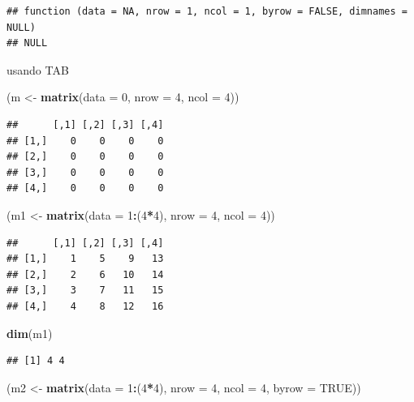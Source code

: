 \documentclass[]{book}
\newenvironment{Shaded}{\begin{snugshade}}{\end{snugshade}}
\newcommand{\KeywordTok}[1]{\textcolor[rgb]{0.13,0.29,0.53}{\textbf{#1}}}
\newcommand{\DataTypeTok}[1]{\textcolor[rgb]{0.13,0.29,0.53}{#1}}
\newcommand{\DecValTok}[1]{\textcolor[rgb]{0.00,0.00,0.81}{#1}}
\newcommand{\StringTok}[1]{\textcolor[rgb]{0.31,0.60,0.02}{#1}}
\newcommand{\OtherTok}[1]{\textcolor[rgb]{0.56,0.35,0.01}{#1}}
\newcommand{\OperatorTok}[1]{\textcolor[rgb]{0.81,0.36,0.00}{\textbf{#1}}}
\newcommand{\NormalTok}[1]{#1}
\begin{document}
\begin{verbatim}
## function (data = NA, nrow = 1, ncol = 1, byrow = FALSE, dimnames = NULL) 
## NULL
\end{verbatim}

usando TAB

\begin{Shaded}
\begin{Highlighting}[]
\NormalTok{(m <-}\StringTok{ }\KeywordTok{matrix}\NormalTok{(}\DataTypeTok{data =} \DecValTok{0}\NormalTok{, }\DataTypeTok{nrow =} \DecValTok{4}\NormalTok{, }\DataTypeTok{ncol =} \DecValTok{4}\NormalTok{))}
\end{Highlighting}
\end{Shaded}

\begin{verbatim}
##      [,1] [,2] [,3] [,4]
## [1,]    0    0    0    0
## [2,]    0    0    0    0
## [3,]    0    0    0    0
## [4,]    0    0    0    0
\end{verbatim}

\begin{Shaded}
\begin{Highlighting}[]
\NormalTok{(m1 <-}\StringTok{ }\KeywordTok{matrix}\NormalTok{(}\DataTypeTok{data =} \DecValTok{1}\OperatorTok{:}\NormalTok{(}\DecValTok{4}\OperatorTok{*}\DecValTok{4}\NormalTok{), }\DataTypeTok{nrow =} \DecValTok{4}\NormalTok{, }\DataTypeTok{ncol =} \DecValTok{4}\NormalTok{))}
\end{Highlighting}
\end{Shaded}

\begin{verbatim}
##      [,1] [,2] [,3] [,4]
## [1,]    1    5    9   13
## [2,]    2    6   10   14
## [3,]    3    7   11   15
## [4,]    4    8   12   16
\end{verbatim}

\begin{Shaded}
\begin{Highlighting}[]
\KeywordTok{dim}\NormalTok{(m1)}
\end{Highlighting}
\end{Shaded}

\begin{verbatim}
## [1] 4 4
\end{verbatim}

\begin{Shaded}
\begin{Highlighting}[]
\NormalTok{(m2 <-}\StringTok{ }\KeywordTok{matrix}\NormalTok{(}\DataTypeTok{data =} \DecValTok{1}\OperatorTok{:}\NormalTok{(}\DecValTok{4}\OperatorTok{*}\DecValTok{4}\NormalTok{), }\DataTypeTok{nrow =} \DecValTok{4}\NormalTok{, }\DataTypeTok{ncol =} \DecValTok{4}\NormalTok{, }\DataTypeTok{byrow =} \OtherTok{TRUE}\NormalTok{))}
\end{Highlighting}
\end{Shaded}
\end{document}
